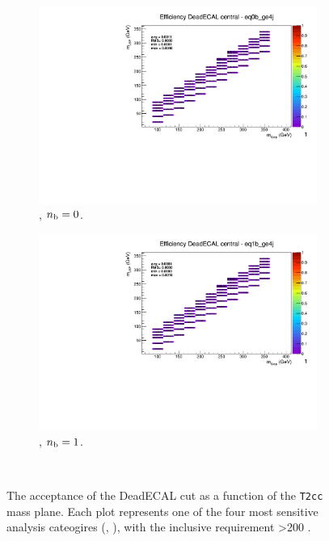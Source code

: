 \begin{figure}[h!]
  \begin{subfigure}[b]{0.4\textwidth}
    \includegraphics[width=\textwidth, page=5]{Figs/sms/t2cc/v37_2/systs/T2cc_DeadECAL_eq0b_ge4j.pdf}
    \caption{\njhigh, $n_{\text{b}} = 0$.}
  \end{subfigure}
  \begin{subfigure}[b]{0.4\textwidth}
    \includegraphics[width=\textwidth, page=5]{Figs/sms/t2cc/v37_2/systs/T2cc_DeadECAL_eq1b_ge4j.pdf}
    \caption{\njhigh, $n_{\text{b}} = 1$.}
  \end{subfigure}\\
  \caption{The acceptance of the DeadECAL cut as a function of the \texttt{T2cc}
  mass plane. Each plot represents one of the four most sensitive 
  analysis cateogires (\nb, \nj), with the inclusive requirement \HT>200 \gev.}
  \label{fig:sms-deadecal-t2cc}
\end{figure}

